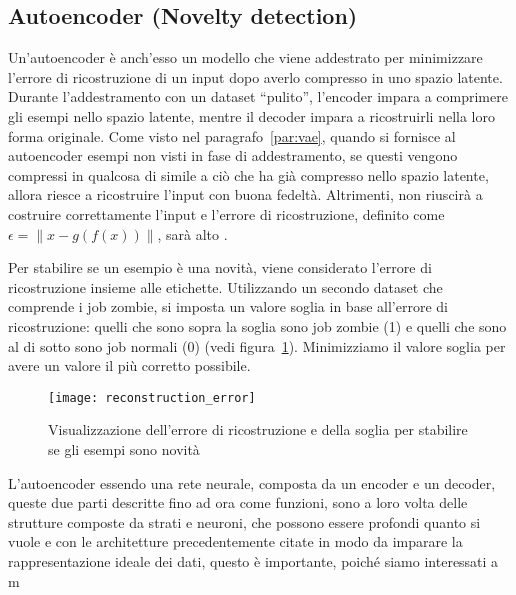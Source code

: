 

\subsection{Autoencoder (Novelty detection)}

Un'autoencoder è anch'esso un modello che viene addestrato per minimizzare
l'errore di ricostruzione di un input dopo averlo compresso in uno spazio
latente. Durante l'addestramento con un dataset ``pulito'', l'encoder impara a
comprimere gli esempi nello spazio latente, mentre il decoder impara a
ricostruirli nella loro forma originale. Come visto nel
paragrafo~\ref{par:vae}, quando si fornisce al autoencoder esempi non visti in
fase di addestramento, se questi vengono compressi in qualcosa di simile a ciò
che ha già compresso nello spazio latente, allora riesce a ricostruire l'input
con buona fedeltà. Altrimenti, non riuscirà a costruire correttamente l'input
e l'errore di ricostruzione, definito come $\epsilon=\lVert x-g(f(x))\rVert$,
sarà alto \cite{borghesi2019}.

Per stabilire se un esempio è una novità, viene considerato l'errore di
ricostruzione insieme alle etichette. Utilizzando un secondo dataset che
comprende i job zombie, si imposta un valore soglia in base all'errore di
ricostruzione: quelli che sono sopra la soglia sono job zombie (1) e quelli
che sono al di sotto sono job normali (0) (vedi
figura~\ref{fig:reconstruction_error}). Minimizziamo il valore soglia per
avere un valore il più corretto possibile.

\begin{figure}[!ht]
    \centering
    \texttt{[image: reconstruction\_error]}
    \caption{Visualizzazione dell'errore di ricostruzione e della soglia per
    stabilire se gli esempi sono novità}
    \label{fig:reconstruction_error}
\end{figure}

L'autoencoder essendo una rete neurale, composta da un encoder e un decoder,
queste due parti descritte fino ad ora come funzioni, sono a loro volta delle
strutture composte da strati e neuroni, che possono essere profondi quanto si
vuole e con le architetture precedentemente citate in modo da imparare la
rappresentazione ideale dei dati, questo è importante, poiché siamo
interessati a m


